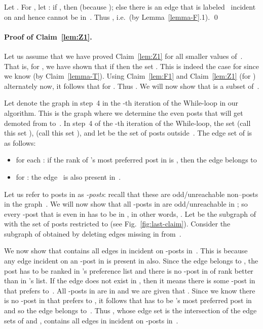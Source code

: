 \documentclass[11pt]{llncs}
\begin{document}
\smallskip

Let . For , let : 
if , then  (because ); 
else there is an edge  that is labeled~ incident on  and hence  
cannot be in~. Thus , i.e.\  (by 
Lemma~\ref{lemma-F}.1). \qed




\paragraph{Proof of Claim~\ref{lem:Z1}.}
Let us assume that we have proved Claim~\ref{lem:Z1} for all smaller values of~. That is, for , we have
shown that if  then the set . This is indeed the case for 
since we know  (by Claim~\ref{lemma-T}).
Using Claim~\ref{lem:F1} and Claim~\ref{lem:Z1} (for ) alternately now, it follows that 
 for . Thus . We will now show that  is a subset of~.

\smallskip


Let  denote the graph  in step~4 in the -th iteration of the While-loop in our 
algorithm. This is the graph where we determine the even posts that will get demoted from 
 to~. In step~4 of the -th iteration of the While-loop, the set  
(call this set ),  (call this set ), and let  be the set of posts 
outside~. The edge set of  is as follows: 
\begin{itemize}
\item for each : if the rank of 's most preferred post  in  is , then the 
edge  belongs to 
\item for : the edge~ is also present in~.
\end{itemize}

Let us refer to posts in  
as {\em -posts}: recall that these are odd/unreachable non--posts in the graph~.
We will now show that all -posts in  are odd/unreachable in ;
so every -post that is even in  has to be in , in other words, . 
Let  be the subgraph of  with the set of posts restricted to  
(see Fig.~\ref{fig:last-claim}).
Consider the subgraph  of  obtained by deleting edges missing in  from~.

We now show that  contains all edges in  incident on -posts in~. 
This is because any edge  incident on an -post  in  is present 
in  also. Since the edge  belongs to , the post  has to be ranked  
in 's preference list and there is no -post in  of rank better than  in 's 
list. If the edge  does not exist in , then it means there is some -post in 
 that  prefers to~. All -posts in  are in  and we are given 
that . Since we know there is no -post in  that  
prefers to , it follows that  has to be 's most preferred post in  and so the 
edge  belongs to~. Thus , whose edge set is the intersection of the edge sets 
of  and , contains all edges in  incident on -posts in~. 
\end{document}
